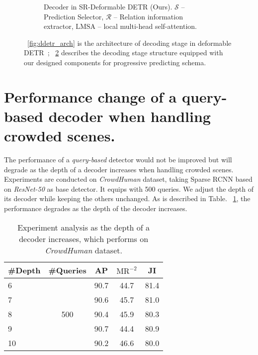 \documentclass[final]{cvpr}
\begin{document}
\begin{figure}[!t]
\begin{subfigure}{\linewidth}
     \caption{Decoder in SR-Deformable DETR (Ours). $\mathcal{S}$ -- Prediction Selector, $\mathcal{R}$ -- Relation information extractor, $\text{LMSA}$ -- local multi-head self-attention.}
    \label{fig:sr_ddetr}
  \end{subfigure}
  \vspace{-0.5pc}
  \caption{~\ref{fig:ddetr_arch} is the architecture of decoding stage in deformable DETR~\cite{zhu2021deformable};
  ~\ref{fig:sr_ddetr} describes the decoding stage structure equipped with our designed components for progressive predicting schema. }
  
\end{figure}







\vspace{-0.2cm}
\section{Performance change of a query-based decoder when handling crowded scenes.}
The performance of a \emph{query-based} detector would not be improved but will degrade as the depth of a decoder increases when handling crowded scenes. Experiments are conducted on \emph{CrowdHuman} dataset, taking Sparse RCNN based on \emph{ResNet-50} as base detector. It equips with 500 queries. We adjust the depth of its decoder while keeping the others unchanged. As is described in Table. ~\ref{tbl:depth_exp}, the performance degrades as the depth of the decoder increases.

\vspace{-0.2cm}
\begin{table}[ht]
	\centering
	\begin{tabular}{l|c|ccc}
		\toprule
		 \#Depth& \#Queries & AP & $\text{MR}^{-2}$  & JI \\
		\hline
		 6 & & 90.7 & 44.7 & 81.4 \\
		 7 & & 90.6 & 45.7 & 81.0 \\
		8 & 500& 90.4 & 45.9 & 80.3 \\
		9 & & 90.7 & 44.4 & 80.9 \\
        10 & & 90.2 & 46.6 & 80.0 \\
		\bottomrule
	\end{tabular}
	\caption{Experiment analysis as the depth of a decoder increases, which performs on \emph{CrowdHuman} dataset.}
	\label{tbl:depth_exp}
	\vspace{-1.5pc}
\end{table}
\end{document}
